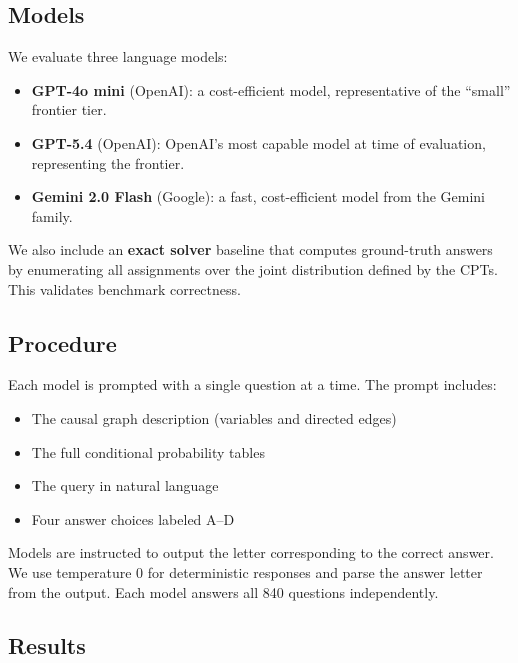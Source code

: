 \documentclass[11pt,a4paper]{article}
\begin{document}
\subsection{Models}

We evaluate three language models:

\begin{itemize}
  \item \textbf{GPT-4o mini} (OpenAI): a cost-efficient model, representative of the ``small'' frontier tier.
  \item \textbf{GPT-5.4} (OpenAI): OpenAI's most capable model at time of evaluation, representing the frontier.
  \item \textbf{Gemini 2.0 Flash} (Google): a fast, cost-efficient model from the Gemini family.
\end{itemize}

We also include an \textbf{exact solver} baseline that computes ground-truth answers by enumerating all assignments over the joint distribution defined by the CPTs. This validates benchmark correctness.

\subsection{Procedure}

Each model is prompted with a single question at a time. The prompt includes:
\begin{itemize}
  \item The causal graph description (variables and directed edges)
  \item The full conditional probability tables
  \item The query in natural language
  \item Four answer choices labeled A--D
\end{itemize}

Models are instructed to output the letter corresponding to the correct answer. We use temperature 0 for deterministic responses and parse the answer letter from the output. Each model answers all 840 questions independently.

\subsection{Results}
\end{document}
